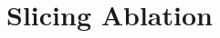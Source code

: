 \documentclass[aspectratio=169,10pt]{beamer}
\begin{document}




\section{Slicing Ablation}\label{sec:slicing}
\end{document}
